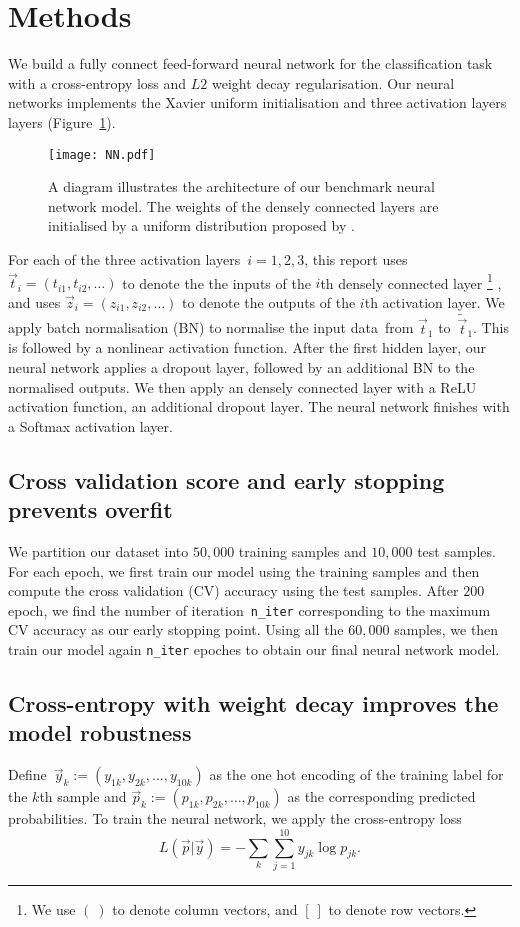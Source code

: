 \section{Methods \label{chapter2}}
We build a fully connect feed-forward neural network for the classification task with a cross-entropy loss and $L2$ weight decay regularisation. Our neural networks implements the Xavier uniform initialisation and three activation layers layers (Figure~\ref{fig:nn}). 
\begin{figure}
    \centering
    \texttt{[image: NN.pdf]}
    \caption{A diagram illustrates the architecture of our benchmark neural network model. The weights of the densely connected layers are initialised by a uniform distribution proposed by \citet{pmlr-v9-glorot10a}.}
    \label{fig:nn}
\end{figure}
For each of the three activation layers~$i=1,2,3$, this report uses $\vec t_i=(t_{i1},t_{i2},\ldots)$ to denote the the inputs of the $i$th densely connected layer
\footnote{We use $(\ )$ to denote column vectors, and $[\ ]$ to denote row vectors.}
, and uses $\vec z_i=(z_{i1},z_{i2},\ldots)$ to denote the outputs of the $i$th activation layer. 
We apply batch normalisation (BN) to normalise the input data~from $\vec t_1$ to~$\tilde{\vec t}_1$. This is followed by a nonlinear activation function. After the first hidden layer, our neural network applies a dropout layer, followed by an additional BN to the normalised outputs. 
We then apply an densely connected layer with a ReLU activation function, an additional dropout layer. The neural network finishes with a Softmax activation layer. 

\subsection{Cross validation score and early stopping prevents overfit\label{sec:early}}
We partition our dataset into $50,000$ training samples and $10,000$ test samples. For each epoch, we first train our model using the training samples and then compute the cross validation (CV) accuracy using the test samples. After $200$ epoch, we find the number of iteration~\texttt{n\_iter} corresponding to the maximum CV accuracy as our early stopping point. Using all the $60,000$ samples, we then train our model again  \texttt{n\_iter} epoches to obtain our final neural network model.

\subsection{Cross-entropy with weight decay improves the model robustness}
Define~$\vec y_k:=(y_{1k},y_{2k},\ldots,y_{10k})$ as the one hot encoding of the training label for the $k$th sample and $\vec p_k:=(p_{1k},p_{2k},\ldots,p_{10k})$ as the corresponding predicted probabilities. To train the neural network, we apply the cross-entropy loss 
\begin{equation}
  {L(\vec p|\vec y)=-\sum_{k}\sum _{j=1}^{10} y_{jk}\log p_{jk}}.  \label{eq:loss}
\end{equation}

